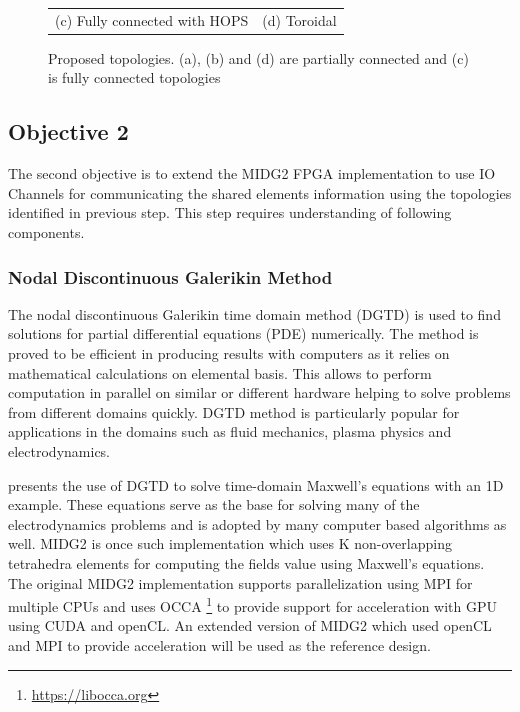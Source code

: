 \documentclass[english,notitlepage]{hgbreport}
\begin{document}
\begin{figure}[h]
\begin{tabular}{c@{\hskip 0.5in}c}
		(c) Fully connected with HOPS & (d) Toroidal
	\end{tabular}
	\caption{Proposed topologies. (a), (b) and (d) are partially connected and (c) is
	fully connected topologies} 
	\label{fig:topologies}
\end{figure}

\subsection{Objective 2}

The second objective is to extend the MIDG2 FPGA implementation to use IO Channels for communicating
the shared elements information using the topologies identified in previous step.
This step requires understanding of following components.

\subsubsection{Nodal Discontinuous Galerikin Method}	%

The nodal discontinuous Galerikin time domain method (DGTD) \cite{hesthaven_nodal_2008} is used to find solutions
for partial differential equations (PDE) numerically. The method is proved to be efficient in
producing results with computers as it relies on mathematical calculations on elemental basis.
This allows to perform computation in parallel on similar or different hardware helping to
solve problems from different domains quickly. DGTD method is particularly popular for applications
in the domains such as fluid mechanics, plasma physics and electrodynamics.

\textcite{Hesthaven_190449} presents the use of DGTD to solve time-domain Maxwell's equations with an 1D example.
These equations serve as the base for solving many of the electrodynamics problems and is adopted by
many computer based algorithms as well. MIDG2 is once such implementation which uses K non-overlapping tetrahedra elements
for computing the fields value using Maxwell's equations. The original MIDG2 implementation supports
parallelization using MPI for multiple CPUs and uses OCCA \footnote{\url{https://libocca.org}} to provide
support for acceleration with GPU using CUDA and openCL. An extended version of MIDG2 which used openCL and
MPI to provide acceleration will be used as the reference design.
\end{document}
